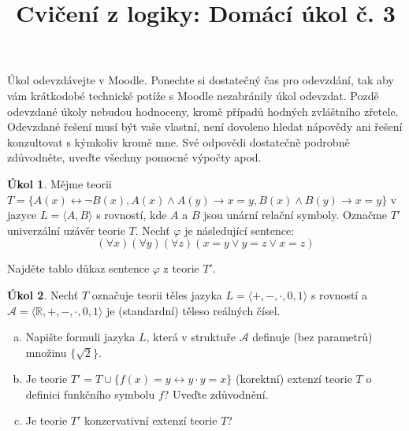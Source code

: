 \documentclass{amsart}
\title{\sc Cvičení z logiky: Domácí úkol č. 3}
\theoremstyle{definition}
\newtheorem{task}{Úkol}
\begin{document}
\maketitle

\thispagestyle{empty}

Úkol odevzdávejte v Moodle. Ponechte si dostatečný čas pro odevzdání, tak aby vám krátkodobé technické potíže s Moodle nezabránily úkol odevzdat. Pozdě odevzdané úkoly nebudou hodnoceny, kromě případů hodných zvláštního zřetele. Odevzdané řešení musí být vaše vlastní, není dovoleno hledat nápovědy ani řešení konzultovat s kýmkoliv kromě mne. Své odpovědi dostatečně podrobně zdůvodněte, uveďte všechny pomocné výpočty apod.



\medskip
\begin{task}
Mějme teorii $T=\{A(x)\leftrightarrow \neg B(x),A(x)\wedge A(y)\to x=y,B(x)\wedge B(y)\to x=y\}$ v jazyce $L=\langle A,B\rangle$ s rovností, kde  $A$ a $B$ jsou unární relační symboly. Označme $T'$ univerzální uzávěr teorie $T$. Nechť $\varphi$ je následující sentence:
$$
(\forall x)(\forall y)(\forall z)(x=y\vee y=z\vee x=z)
$$

Najděte tablo důkaz sentence $\varphi$ z teorie $T'$.
\end{task}


\medskip
\begin{task}
Nechť $T$ označuje teorii těles jazyka $L=\langle +,-,\cdot,0,1 \rangle$ s rovností a $\mathcal{A}=\langle\mathbb{R},+,-,\cdot,0,1 \rangle$ je (standardní) těleso reálných čísel.
\begin{enumerate}[(a)]
\item Napište formuli jazyka $L$, která v struktuře $\mathcal{A}$ definuje (bez parametrů) množinu $\{\sqrt{2}\}$.
\item Je teorie $T'=T \cup \{f(x)=y \leftrightarrow y\cdot y=x\}$ (korektní) extenzí teorie $T$ o definici funkčního symbolu $f$? Uveďte zdůvodnění.
\item Je teorie $T'$ konzervativní extenzí teorie $T$?
\end{enumerate}
\end{task}
\end{document}
